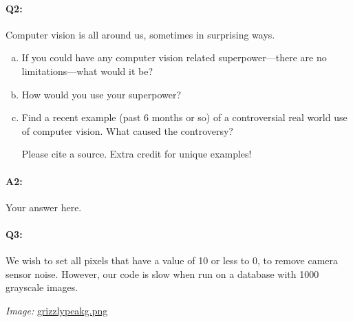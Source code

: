 \documentclass[11pt]{article}
\begin{document}



\pagebreak

\paragraph{Q2:}
Computer vision is all around us, sometimes in surprising ways.
\begin{enumerate}[(a)]

\item
If you could have any computer vision related superpower---there are no limitations---what would it be?

\item
How would you use your superpower?

\item Find a recent example (past 6 months or so) of a controversial real world use of computer vision. What caused the controversy?

Please cite a source. Extra credit for unique examples!
\end{enumerate}

\paragraph{A2:} Your answer here.








\pagebreak
\paragraph{Q3:} We wish to set all pixels that have a value of 10 or less to 0, to remove camera sensor noise. However, our code is slow when run on a database with 1000 grayscale images.

\emph{Image:} \href{grizzlypeakg.png}{grizzlypeakg.png}
\end{document}
